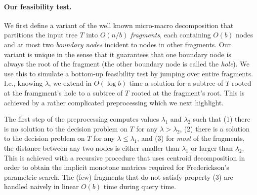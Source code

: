 \documentclass[11pt,a4paper]{article}
\theoremstyle{definition}
\theoremstyle{remark}
\begin{document}
 

%

\paragraph{Our feasibility test.}
We first define a variant of the well known micro-macro decomposition that partitions the input tree $T$ into $O(n/b)$ {\em fragments}, each containing $O(b)$ nodes and at most two {\em boundary nodes} incident to nodes in other fragments. Our variant is unique in the sense that it guarantees that one boundary node is always the root of the fragment (the other boundary node is called the {\em hole}). We use this to
 simulate a bottom-up feasibility test by jumping over entire 
fragments. I.e., knowing $\lambda$, we extend in $O(\log b)$ time a solution for a subtree of $T$ rooted at the framgment's hole to a subtree of $T$ rooted at the fragment's root. This is achieved by a rather complicated preprocessing which we next highlight.

The first step of the preprocessing computes values $\lambda_1$ and  $\lambda_2$ such that (1) there is no solution to the decision problem on $T$ for any $\lambda > \lambda_2$, (2) there is a solution to the decision problem on $T$ for any $\lambda \le \lambda_1$, and (3) for {\em most} of the fragments, the distance between any two nodes is either smaller than $\lambda_1$ or larger than $\lambda_2$. This is achieved with a recursive procedure that uses centroid decomposition in order to obtain the implicit monotone matrices required for Frederickson's parametric search. The (few) fragments that do not satisfy property (3) are handled naively in linear $O(b)$ time during query time. 
\end{document}
